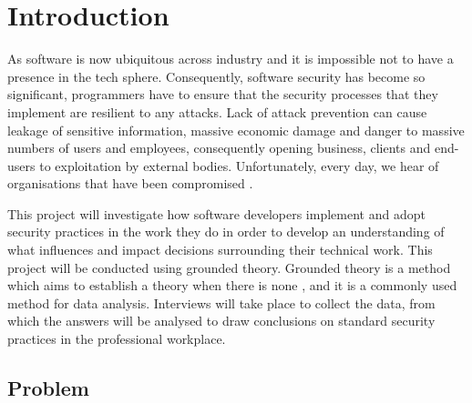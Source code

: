 \chapter{Introduction}\label{C:intro}

\par As software is now ubiquitous across industry and it is impossible not to have a presence in the tech sphere. Consequently, software security has become so significant, programmers have to ensure that the security processes that they implement are resilient to any attacks. Lack of attack prevention can cause leakage of sensitive information, massive economic damage and danger to massive numbers of users and employees, consequently opening business, clients and end-users to exploitation by external bodies. Unfortunately, every day, we hear of organisations that have been compromised \cite{1}.
\newline
\par This project will investigate how software developers implement and adopt security practices in the work they do in order to develop an understanding of what influences and impact decisions surrounding their technical work. This project will be conducted using grounded theory. Grounded theory is a method which aims to establish a theory when there is none \cite{2}, and it is a commonly used method for data analysis. Interviews will take place to collect the data, from which the answers will be analysed to draw conclusions on standard security practices in the professional workplace.

\section{Problem}

